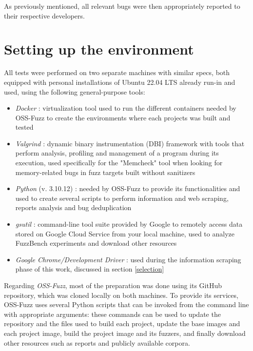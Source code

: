 As previously mentioned, all relevant bugs were then appropriately reported to their respective developers.



\newpage
\section{Setting up the environment}
All tests were performed on two separate machines with similar specs, both equipped with personal installations of Ubuntu 22.04 LTS already run-in and used, using the following general-purpose tools:
\begin{itemize}
    \item \textit{Docker} \cite{Docker}: virtualization tool used to run the different containers needed by OSS-Fuzz to create the environments where each projects was built and tested
    \item \textit{Valgrind} \cite{Valgrind_1}\cite{Valgrind_2}: dynamic binary instrumentation (DBI) framework with tools that perform analysis, profiling and management of a program during its execution, used specifically for the "Memcheck" tool when looking for memory-related bugs in fuzz targets built without sanitizers
    \item \textit{Python} (v. 3.10.12) \cite{python}: needed by OSS-Fuzz to provide its functionalities and used to create several scripts to perform information and web scraping, reports analysis and bug deduplication
    \item \textit{gsutil} \cite{gsutil}: command-line tool suite provided by Google to remotely access data stored on Google Cloud Service from your local machine, used to analyze FuzzBench experiments and download other resources
    \item \textit{Google Chrome/Development Driver} \cite{driver}: used during the information scraping phase of this work, discussed in section \ref{selection}
\end{itemize}

Regarding \textit{OSS-Fuzz}, most of the preparation was done using its GitHub repository, which was cloned locally on both machines. To provide its services, OSS-Fuzz uses several Python scripts that can be invoked from the command line with appropriate arguments: these commands can be used to update the repository and the files used to build each project, update the base images and each project image, build the project image and its fuzzers, and finally download other resources such as reports and publicly available corpora. 

